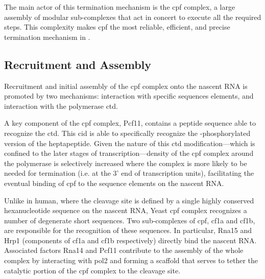 The main actor of this termination mechanism is the \gls{cpf} complex, a large assembly of modular sub-complexes that act in concert to execute all the required steps. 
This complexity makes \gls{cpf} the most reliable, efficient, and precise termination mechanism in \cer{}.




\subsection{Recruitment and Assembly}


Recruitment and initial assembly of the \gls{cpf} complex onto the nascent RNA is promoted by two mechanisms: interaction with specific sequences elements, and interaction with the polymerase \gls{ctd}.

A key component of the \gls{cpf} complex, Pcf11, contains a peptide sequence able to recognize the \gls{ctd}. This \gls{cid} is able to specifically recognize the \sert{}-phosphorylated version of the heptapeptide.
Given the nature of this \gls{ctd} modification---which is confined to the later stages of transcription---density of the \gls{cpf} complex around the polymerase is selectively increased where the complex is more likely to be needed for termination (i.e. at the 3' end of transcription units), facilitating the eventual binding of \gls{cpf} to the sequence elements on the nascent RNA.

Unlike in human, where the cleavage site is defined by a single highly conserved hexanucleotide sequence on the nascent RNA, Yeast \gls{cpf} complex recognizes a number of degenerate short sequences.
Two sub-complexes of \gls{cpf}, \gls{cf1a} and \gls{cf1b}, are responsible for the recognition of these sequences.
In particular, Rna15 and Hrp1 (components of \gls{cf1a} and \gls{cf1b} respectively) directly bind the nascent RNA.
Associated factors Rna14 and Pcf11 contribute to the assembly of the whole complex by interacting with \gls{pol2} and forming a scaffold that serves to tether the catalytic portion of the \gls{cpf} complex to the cleavage site.

